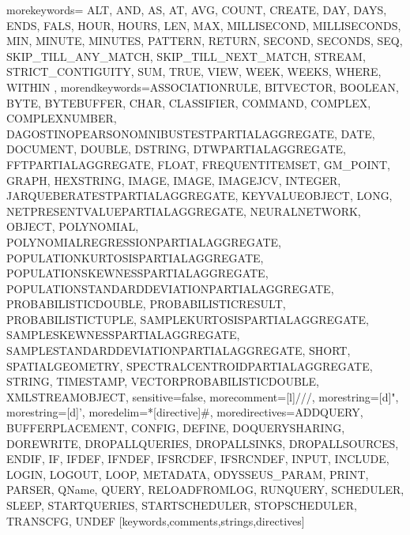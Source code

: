    {morekeywords={%
ALT, AND, AS, AT, AVG, COUNT, CREATE, DAY, DAYS, ENDS, FALS, HOUR, HOURS, LEN, MAX, MILLISECOND, MILLISECONDS, MIN, MINUTE, MINUTES, PATTERN, RETURN, SECOND, SECONDS, SEQ, SKIP_TILL_ANY_MATCH, SKIP_TILL_NEXT_MATCH, STREAM, STRICT_CONTIGUITY, SUM, TRUE, VIEW, WEEK, WEEKS, WHERE, WITHIN%
      },%
   morendkeywords={ASSOCIATIONRULE, BITVECTOR, BOOLEAN, BYTE, BYTEBUFFER, CHAR, CLASSIFIER, COMMAND, COMPLEX, COMPLEXNUMBER, DAGOSTINOPEARSONOMNIBUSTESTPARTIALAGGREGATE, DATE, DOCUMENT, DOUBLE, DSTRING, DTWPARTIALAGGREGATE, FFTPARTIALAGGREGATE, FLOAT, FREQUENTITEMSET, GM_POINT, GRAPH, HEXSTRING, IMAGE, IMAGE, IMAGEJCV, INTEGER, JARQUEBERATESTPARTIALAGGREGATE, KEYVALUEOBJECT, LONG, NETPRESENTVALUEPARTIALAGGREGATE, NEURALNETWORK, OBJECT, POLYNOMIAL, POLYNOMIALREGRESSIONPARTIALAGGREGATE, POPULATIONKURTOSISPARTIALAGGREGATE, POPULATIONSKEWNESSPARTIALAGGREGATE, POPULATIONSTANDARDDEVIATIONPARTIALAGGREGATE, PROBABILISTICDOUBLE, PROBABILISTICRESULT, PROBABILISTICTUPLE, SAMPLEKURTOSISPARTIALAGGREGATE, SAMPLESKEWNESSPARTIALAGGREGATE, SAMPLESTANDARDDEVIATIONPARTIALAGGREGATE, SHORT, SPATIALGEOMETRY, SPECTRALCENTROIDPARTIALAGGREGATE, STRING, TIMESTAMP, VECTORPROBABILISTICDOUBLE, XMLSTREAMOBJECT},%
   sensitive=false,
   morecomment=[l]///,%
   morestring=[d]",%
   morestring=[d]',%
   moredelim=*[directive]\#,%
   moredirectives={ADDQUERY, BUFFERPLACEMENT, CONFIG, DEFINE, DOQUERYSHARING, DOREWRITE, DROPALLQUERIES, DROPALLSINKS, DROPALLSOURCES, ENDIF, IF, IFDEF, IFNDEF, IFSRCDEF, IFSRCNDEF, INPUT, INCLUDE, LOGIN, LOGOUT, LOOP, METADATA, ODYSSEUS_PARAM, PRINT, PARSER, QName, QUERY, RELOADFROMLOG, RUNQUERY, SCHEDULER, SLEEP, STARTQUERIES, STARTSCHEDULER, STOPSCHEDULER, TRANSCFG, UNDEF}%
}[keywords,comments,strings,directives]

